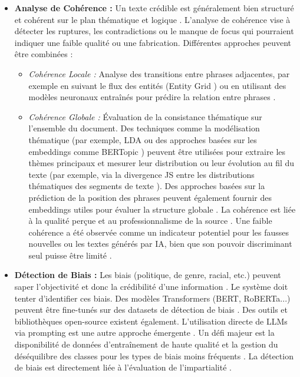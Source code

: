 \documentclass[9pt,twocolumn,french]{article}
\begin{document}
\begin{itemize}
    \item \textbf{Analyse de Cohérence :} Un texte crédible est généralement bien structuré et cohérent sur le plan thématique et logique \citep{Mikolov2020Efficient, Li2014A, Willems2020Modeling, Barzilay2008}. L'analyse de cohérence vise à détecter les ruptures, les contradictions ou le manque de focus qui pourraient indiquer une faible qualité ou une fabrication. Différentes approches peuvent être combinées :
        \begin{itemize}
            \item \textit{Cohérence Locale :} Analyse des transitions entre phrases adjacentes, par exemple en suivant le flux des entités (Entity Grid \citep{Barzilay2008}) ou en utilisant des modèles neuronaux entraînés pour prédire la relation entre phrases \citep{Barzilay2008}.
            \item \textit{Cohérence Globale :} Évaluation de la consistance thématique sur l'ensemble du document. Des techniques comme la modélisation thématique (par exemple, LDA \citep{Ahmed2025Aidriven} ou des approches basées sur les embeddings comme BERTopic \citep{Willems2020Modeling}) peuvent être utilisées pour extraire les thèmes principaux et mesurer leur distribution ou leur évolution au fil du texte (par exemple, via la divergence JS entre les distributions thématiques des segments de texte \citep{Willems2020Modeling}). Des approches basées sur la prédiction de la position des phrases peuvent également fournir des embeddings utiles pour évaluer la structure globale \citep{Mikolov2020Efficient, Li2014A}. La cohérence est liée à la qualité perçue et au professionnalisme de la source \citep{Rieh2014Credibility}. Une faible cohérence a été observée comme un indicateur potentiel pour les fausses nouvelles ou les textes générés par IA, bien que son pouvoir discriminant seul puisse être limité \citep{Willems2020Modeling}.
        \end{itemize}

    \item \textbf{Détection de Biais :} Les biais (politique, de genre, racial, etc.) peuvent saper l'objectivité et donc la crédibilité d'une information \citep{Shah2024Decoding, Menzner2018Biasscanner, Baly2020We, Krieger2021, Garg2019Counterfactual}. Le système doit tenter d'identifier ces biais. Des modèles Transformers (BERT, RoBERTa...) peuvent être fine-tunés sur des datasets de détection de biais \citep{Shah2024Decoding, Menzner2018Biasscanner, Krieger2021}. Des outils et bibliothèques open-source existent également. L'utilisation directe de LLMs via prompting est une autre approche émergente \citep{Shah2024Decoding, Menzner2018Biasscanner, Chen2019Detecting, Krieger2021}. Un défi majeur est la disponibilité de données d'entraînement de haute qualité et la gestion du déséquilibre des classes pour les types de biais moins fréquents \citep{Shah2024Decoding}. La détection de biais est directement liée à l'évaluation de l'impartialité \citep{Rieh2014Credibility}.


\end{itemize}
\end{document}
